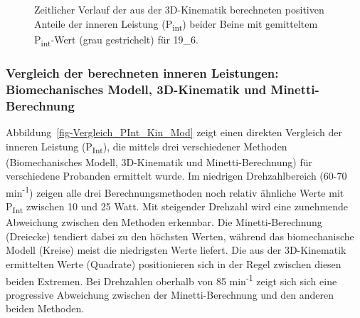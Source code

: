 \documentclass[
  letterpaper,
  DIV=11]{scrartcl}
\begin{document}
\begin{figure}


\caption{\label{fig-PInt_Kinematik_19_6}Zeitlicher Verlauf der aus der
3D-Kinematik berechneten positiven Anteile der inneren Leistung
(P\textsubscript{int}) beider Beine mit gemitteltem
P\textsubscript{int}-Wert (grau gestrichelt) für 19\_6.}

\end{figure}%

\subsubsection{Vergleich der berechneten inneren Leistungen:
Biomechanisches Modell, 3D-Kinematik und
Minetti-Berechnung}\label{vergleich-der-berechneten-inneren-leistungen-biomechanisches-modell-3d-kinematik-und-minetti-berechnung}

Abbildung~\ref{fig-Vergleich_PInt_Kin_Mod} zeigt einen direkten
Vergleich der inneren Leistung (P\textsubscript{Int}), die mittels drei
verschiedener Methoden (Biomechanisches Modell, 3D-Kinematik und
Minetti-Berechnung) für verschiedene Probanden ermittelt wurde. Im
niedrigen Drehzahlbereich (60-70 min\textsuperscript{-1}) zeigen alle
drei Berechnungsmethoden noch relativ ähnliche Werte mit
P\textsubscript{Int} zwischen 10 und 25 Watt. Mit steigender Drehzahl
wird eine zunehmende Abweichung zwischen den Methoden erkennbar. Die
Minetti-Berechnung (Dreiecke) tendiert dabei zu den höchsten Werten,
während das biomechanische Modell (Kreise) meist die niedrigsten Werte
liefert. Die aus der 3D-Kinematik ermittelten Werte (Quadrate)
positionieren sich in der Regel zwischen diesen beiden Extremen. Bei
Drehzahlen oberhalb von 85 min\textsuperscript{-1} zeigt sich sich eine
progressive Abweichung zwischen der Minetti-Berechnung und den anderen
beiden Methoden.
\end{document}

